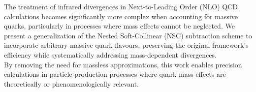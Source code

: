 
The treatment of infrared divergences in Next-to-Leading Order (NLO) QCD calculations becomes significantly more complex when accounting for massive quarks, particularly in processes where mass effects cannot be neglected. We present a generalization of the Nested Soft-Collinear (NSC) subtraction scheme to incorporate arbitrary massive quark flavours, preserving the original framework’s efficiency while systematically addressing mass-dependent divergences. \\
By removing the need for massless approximations, this work enables precision calculations in particle production processes where quark mass effects are theoretically or phenomenologically relevant.
